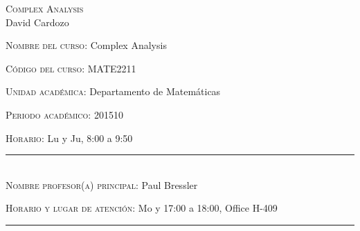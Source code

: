 \begin{center}
\textsc{\large Complex Analysis }\\[0.1cm]
\large David Cardozo\\[0.5cm]
\end{center}	

\large \noindent\textsc{Nombre del curso:}  Complex Analysis%

\noindent\textsc{Código del curso:} MATE2211 %

\noindent\textsc{Unidad académica:} Departamento de Matemáticas

\noindent\textsc{Periodo acad\'emico:} 201510 %

\noindent\textsc{Horario:} Lu y Ju, 8:00 a 9:50%

\noindent\rule{\textwidth}{1pt}\\[-0.3cm]

\normalsize \noindent\textsc{Nombre profesor(a) principal:} Paul Bressler%


\noindent\textsc{Horario y lugar de atenci\'on:} Mo y  17:00 a
18:00, Office H-409

\noindent\rule{\textwidth}{1pt}\\[-0.1cm]